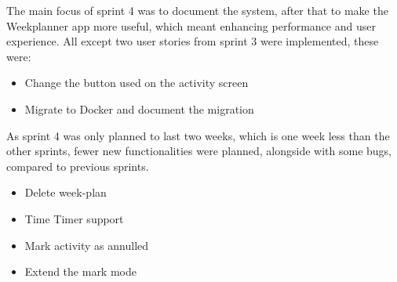 The main focus of sprint 4 was to document the system, after that to make the Weekplanner app more useful, which meant enhancing performance and user experience. All except two user stories from sprint 3 were implemented, these were:

\begin{itemize}
    \item Change the button used on the activity screen
    \item Migrate to Docker and document the migration
\end{itemize}

As sprint 4 was only planned to last two weeks, which is one week less than the other sprints, fewer new functionalities were planned, alongside with some bugs, compared to previous sprints.

\begin{itemize}
    \item Delete week-plan
    \item Time Timer support
    \item Mark activity as annulled
    \item Extend the mark mode
\end{itemize}